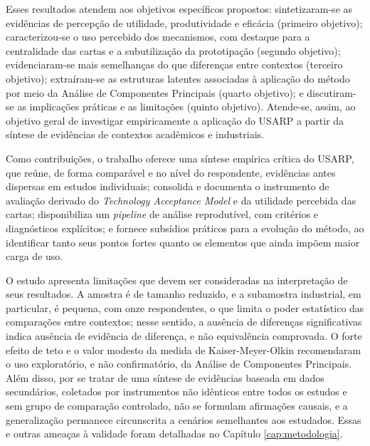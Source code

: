 Esses resultados atendem aos objetivos específicos propostos: sintetizaram-se as evidências de percepção de utilidade, produtividade e eficácia (primeiro objetivo); caracterizou-se o uso percebido dos mecanismos, com destaque para a centralidade das cartas e a subutilização da prototipação (segundo objetivo); evidenciaram-se mais semelhanças do que diferenças entre contextos (terceiro objetivo); extraíram-se as estruturas latentes associadas à aplicação do método por meio da Análise de Componentes Principais (quarto objetivo); e discutiram-se as implicações práticas e as limitações (quinto objetivo). Atende-se, assim, ao objetivo geral de investigar empiricamente a aplicação do USARP a partir da síntese de evidências de contextos acadêmicos e industriais.

Como contribuições, o trabalho oferece uma síntese empírica crítica do USARP, que reúne, de forma comparável e no nível do respondente, evidências antes dispersas em estudos individuais; consolida e documenta o instrumento de avaliação derivado do \textit{Technology Acceptance Model} e da utilidade percebida das cartas; disponibiliza um \textit{pipeline} de análise reprodutível, com critérios e diagnósticos explícitos; e fornece subsídios práticos para a evolução do método, ao identificar tanto seus pontos fortes quanto os elementos que ainda impõem maior carga de uso.

O estudo apresenta limitações que devem ser consideradas na interpretação de seus resultados. A amostra é de tamanho reduzido, e a subamostra industrial, em particular, é pequena, com onze respondentes, o que limita o poder estatístico das comparações entre contextos; nesse sentido, a ausência de diferenças significativas indica ausência de evidência de diferença, e não equivalência comprovada. O forte efeito de teto e o valor modesto da medida de Kaiser-Meyer-Olkin recomendaram o uso exploratório, e não confirmatório, da Análise de Componentes Principais. Além disso, por se tratar de uma síntese de evidências baseada em dados secundários, coletados por instrumentos não idênticos entre todos os estudos e sem grupo de comparação controlado, não se formulam afirmações causais, e a generalização permanece circunscrita a cenários semelhantes aos estudados. Essas e outras ameaças à validade foram detalhadas no Capítulo \ref{cap:metodologia}.

